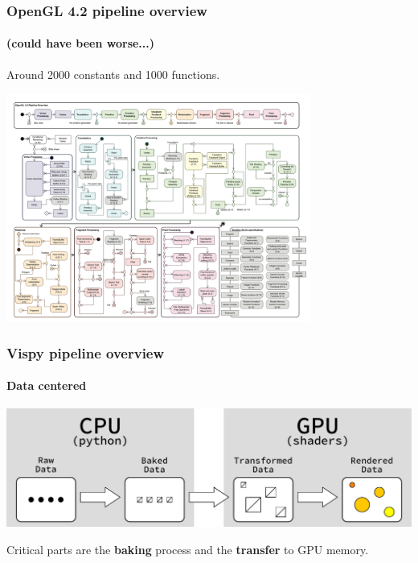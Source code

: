 \documentclass[10pt]{beamer}
\begin{document}
\begin{frame}
  \frametitle{OpenGL 4.2 pipeline overview}
  \framesubtitle{(could have been worse...)}

  Around 2000 constants and 1000 functions.
  \begin{center}
    \includegraphics[width=0.75\textwidth]{GL-Pipeline-4.png}
  \end{center}
\end{frame}


\begin{frame}
  \frametitle{Vispy pipeline overview}
  \framesubtitle{Data centered}
    \begin{center}
      \includegraphics[width=1.0\textwidth]{vispy-pipeline}
    \end{center}
    Critical parts are the {\bf baking} process and the {\bf transfer} to GPU memory.\\
\end{frame}
\end{document}
